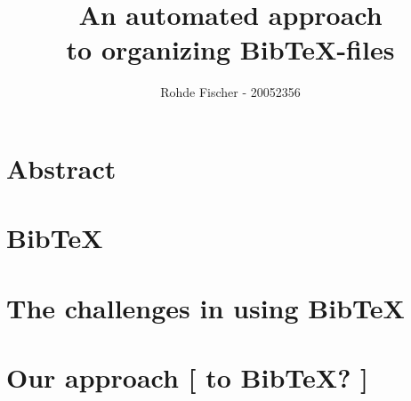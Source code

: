 \documentclass[twoside,11pt,openright,a4paper]{report}
\newcommand{\remark}[1]{{ \bf [ \footnotesize #1 ]}}
\newcommand{\bibtex}{Bib{\TeX}}
\begin{document}
\pagestyle{empty}
\begin{titlepage}
\author{Rohde Fischer - 20052356}
\title{An automated approach\\to organizing {\bibtex}-files}
\maketitle

\end{titlepage}


\pagestyle{plain}
\setcounter{page}{1}

\chapter*{Abstract}

%
%
%
\tableofcontents

\setcounter{secnumdepth}{2}


\chapter{{\bibtex}}
\label{ch:about}


\chapter{The challenges in using {\bibtex}}
\label{ch:problem-description}


\chapter{Our approach \remark{to {\bibtex}?}}
\label{ch:intro}

\end{document}
